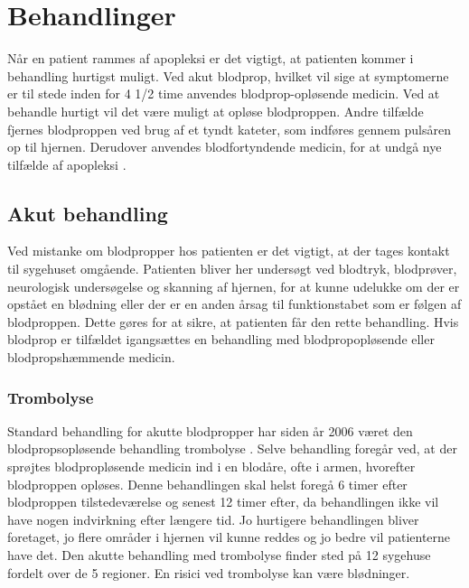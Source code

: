\section{Behandlinger}
Når en patient rammes af apopleksi er det vigtigt, at patienten kommer i behandling hurtigst muligt. Ved akut blodprop, hvilket vil sige at symptomerne er til stede inden for 4 1/2 time anvendes blodprop-opløsende medicin. Ved at behandle hurtigt vil det være muligt at opløse blodproppen. Andre tilfælde fjernes blodproppen ved brug af et tyndt kateter, som indføres gennem pulsåren op til hjernen. Derudover anvendes blodfortyndende medicin, for at undgå nye tilfælde af apopleksi \cite{Hjerteforeningen2014} \cite{Kruuse2014a}.

\subsection{Akut behandling}
Ved mistanke om blodpropper hos patienten er det vigtigt, at der tages kontakt til sygehuset omgående. Patienten bliver her undersøgt ved blodtryk, blodprøver, neurologisk undersøgelse og skanning af hjernen, for at kunne udelukke om der er opstået en blødning eller der er en anden årsag til funktionstabet som er følgen af blodproppen. Dette gøres for at sikre, at patienten får den rette behandling. Hvis blodprop er tilfældet igangsættes en behandling med blodpropopløsende eller blodpropshæmmende medicin. \cite{Hjerteforeningen2014} \cite{Kruuse2014a} 

\subsubsection{Trombolyse}
Standard behandling for akutte blodpropper har siden år 2006 været den blodpropsopløsende behandling trombolyse \cite{Hjernesagen2015b}. Selve behandling foregår ved, at der sprøjtes blodpropløsende medicin ind i en blodåre, ofte i armen, hvorefter blodproppen opløses. Denne behandlingen skal helst foregå 6 timer efter blodproppen tilstedeværelse og senest 12 timer efter, da behandlingen ikke vil have nogen indvirkning efter længere tid. Jo hurtigere behandlingen bliver foretaget, jo flere områder i hjernen vil kunne reddes og jo bedre vil patienterne have det. Den akutte behandling med trombolyse finder sted på 12 sygehuse fordelt over de 5 regioner. En risici ved trombolyse kan være blødninger.\cite{Hjernesagen2015b} 

